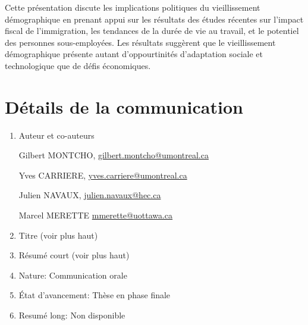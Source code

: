 \vspace{0.7em}\par
Cette présentation discute les implications politiques du vieillissement démographique en prenant appui sur les résultats des études récentes sur l’impact fiscal de l’immigration, les tendances de la durée de vie au travail, et le potentiel des personnes sous-employées. Les résultats suggèrent que le vieillissement démographique présente autant d'oppourtinités d’adaptation sociale et technologique que de défis économiques.


\section*{Détails de la communication}

\begin{enumerate}
  \item Auteur et co-auteurs

  Gilbert MONTCHO,
  \href{mailto:gilbert.montcho@umontreal.ca}{gilbert.montcho@umontreal.ca}

  Yves CARRIERE,
  \href{mailto:yves.carriere@umontreal.ca}{yves.carriere@umontreal.ca}

  Julien NAVAUX,
  \href{mailto:julien.navaux@hec.ca}{julien.navaux@hec.ca}

  Marcel MERETTE
  \href{mailto:mmerette@uottawa.ca}{mmerette@uottawa.ca}

  \item Titre (voir plus haut)
  \item Résumé court (voir plus haut)
  \item Nature: Communication orale
  \item État d'avancement: Thèse en phase finale
  \item Resumé long: Non disponible
\end{enumerate}





